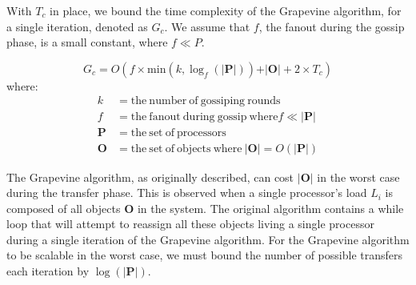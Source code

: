 With $T_c$ in place, we bound the time complexity of the \textsf{Grapevine}
algorithm, for a single iteration, denoted as $G_c$. We assume that $f$, the
fanout during the gossip phase, is a small constant, where $f \ll P$.

\[
G_c = O(f\times \mathrm{min}(k, \log_f(\vert\mathbf{P}\vert)) + \vert\mathbf{O}\vert + 2 \times T_c)
\]
where:
\begin{align*}
 k          & = \mathrm{the\ number\ of\ gossiping\ rounds} \\
 f          & = \mathrm{the\ fanout\ during\ gossip\ where} f \ll \vert\mathbf{P}\vert \\
 \mathbf{P} & = \mathrm{the\ set\ of\ processors} \\
 \mathbf{O} & = \mathrm{the\ set\ of\ objects\ where\ } \vert\mathbf{O}\vert = O(\vert\mathbf{P}\vert)
\end{align*}

%

The \textsf{Grapevine} algorithm, as originally described, can cost
$\vert\mathbf{O}\vert$ in the worst case during the transfer phase. This is
observed when a single processor's load $L_i$ is composed of all objects
$\mathbf{O}$ in the system. The original algorithm contains a while loop that
will attempt to reassign all these objects living a single processor during a
single iteration of the \textsf{Grapevine} algorithm. For the \textsf{Grapevine}
algorithm to be scalable in the worst case, we must bound the number of possible
transfers each iteration by $\log(\vert\mathbf{P}\vert)$.
